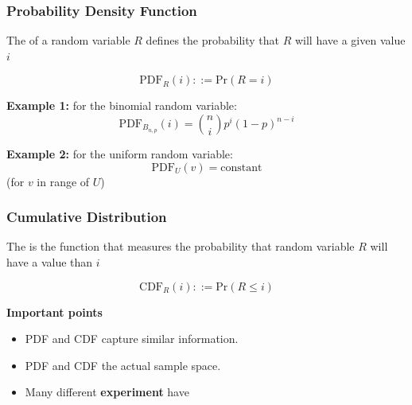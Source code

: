 \documentclass{beamer}
\begin{document}
\begin{frame}
  \frametitle{Probability Density Function}
  
  The  of a random variable $R$
  defines the probability that $R$ will have a given value $i$
  \bigskip

  \begin{equation*}
    \text{PDF}_R(i) ::= \text{Pr}(R = i)
  \end{equation*}
  \bigskip
  
  {\bf Example 1:} for the binomial random variable:
  \begin{equation*}
    \text{PDF}_{B_{n,p}}(i) = \binom{n}{i}p^i(1-p)^{n-i}
  \end{equation*}
  \bigskip
  
  {\bf Example 2:} for the uniform random variable:
  \begin{equation*}
    \text{PDF}_{U}(v) = \text{constant}
  \end{equation*}
  \hfill (for $v$ in range of $U$)
\end{frame}

\begin{frame}
  \frametitle{Cumulative Distribution}

  The  is the function that
  measures the probability that random variable $R$ will have a value
   than $i$
  \bigskip

  \begin{equation*}
    \text{CDF}_R(i) ::= \text{Pr}(R \leq i)
  \end{equation*}
  \vfill

  {\bf Important points}
  \begin{itemize}
  \item PDF and CDF capture similar information.
  \item PDF and CDF  the actual sample space.
  \item Many different {\bf experiment} have 
  \end{itemize}
\end{frame}
\end{document}
